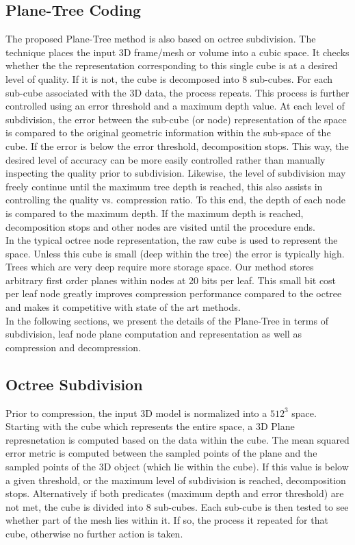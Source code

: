 \subsection{Plane-Tree Coding}

The proposed Plane-Tree method is also based on octree subdivision. The technique places the input 3D frame/mesh or volume into a cubic space. It checks whether the the representation corresponding to this single cube is at a desired level of quality. If it is not, the cube is decomposed into 8 sub-cubes. For each sub-cube associated with the 3D data, the process repeats. This process is further controlled using an error threshold and a maximum depth value. At each level of subdivision, the error between the sub-cube (or node) representation of the space is compared to the original geometric information within the sub-space of the cube. If the error is below the error threshold, decomposition stops. This way, the desired level of accuracy can be more easily controlled rather than manually inspecting the quality prior to subdivision. Likewise, the level of subdivision may freely continue until the maximum tree depth is reached, this also assists in controlling the quality vs. compression ratio. To this end, the depth of each node is compared to the maximum depth. If the maximum depth is reached, decomposition stops and other nodes are visited until the procedure ends. \\

In the typical octree node representation, the raw cube is used to represent the space. Unless this cube is small (deep within the tree) the error is typically high. Trees which are very deep require more storage space. Our method stores arbitrary first order planes within nodes at 20 bits per leaf. This small bit cost per leaf node greatly improves compression performance compared to the octree and makes it competitive with state of the art methods. \\

 
In the following sections, we present the details of the Plane-Tree in terms of subdivision, leaf node plane computation and representation as well as compression and decompression. \\


\subsection{Octree Subdivision}

Prior to compression, the input 3D model is normalized into a $512^3$ space. Starting with the cube which represents the entire space, a 3D Plane represnetation is computed based on the data within the cube. The mean squared error metric is computed between the sampled points of the plane and the sampled points of the 3D object (which lie within the cube). If this value is below a given threshold, or the maximum level of subdivision is reached, decomposition stops. Alternatively if both predicates (maximum depth and error threshold) are not met, the cube is divided into 8 sub-cubes. Each sub-cube is then tested to see whether part of the mesh lies within it. If so, the process it repeated for that cube, otherwise no further action is taken. \\

